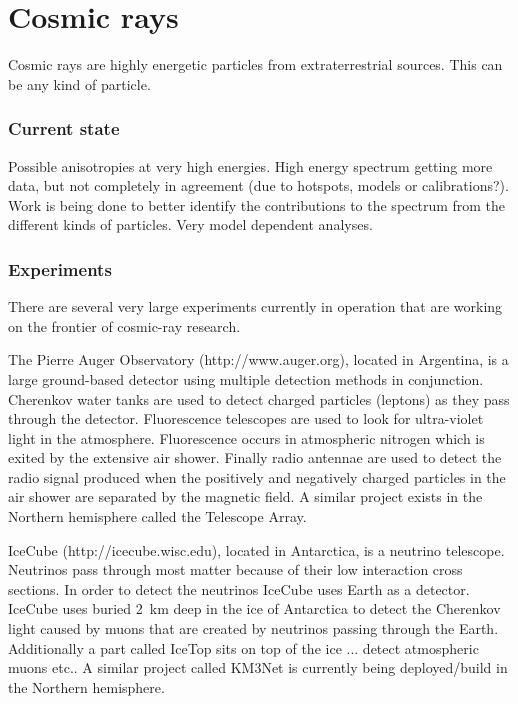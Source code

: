 \chapter{Cosmic rays}
\label{ch:cosmic-rays}

Cosmic rays are highly energetic particles from extraterrestrial sources.
This can be any kind of particle.


\subsection{Current state}

Possible anisotropies at very high energies. High energy spectrum
getting more data, but not completely in agreement (due to hotspots,
models or calibrations?). Work is being done to better identify the
contributions to the spectrum from the different kinds of particles.
Very model dependent analyses.


\subsection{Experiments}

There are several very large experiments currently in operation that are
working on the frontier of cosmic-ray research.

The Pierre Auger Observatory (http://www.auger.org), located in
Argentina, is a large ground-based detector using multiple detection
methods in conjunction. Cherenkov water tanks are used to detect charged
particles (leptons) as they pass through the detector. Fluorescence
telescopes are used to look for ultra-violet light in the atmosphere.
Fluorescence occurs in atmospheric nitrogen which is exited by the 
extensive air shower. Finally radio antennae are used to detect the
radio signal produced when the positively and negatively charged
particles in the air shower are separated by the magnetic field. A
similar project exists in the Northern hemisphere called the Telescope
Array.

IceCube (http://icecube.wisc.edu), located in Antarctica, is a neutrino
telescope. Neutrinos pass through most matter because of their low
interaction cross sections. In order to detect the neutrinos IceCube
uses Earth as a detector. IceCube uses \pmts buried \SI{2}{\kilo\meter}
deep in the ice of Antarctica to detect the Cherenkov light caused by
muons that are created by neutrinos passing through the Earth.
Additionally a part called IceTop sits on top of the ice ... detect
atmospheric muons etc.. A similar project called KM3Net is currently
being deployed/build in the Northern hemisphere.

